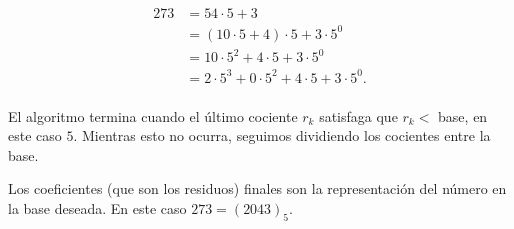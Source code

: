 \documentclass{article}
\begin{document}
\begin{align*}
	273 &= 54\cdot 5 + 3 \\
	&= (10\cdot 5 + 4)\cdot 5 + 3 \cdot 5^0 \\
	&= 10\cdot 5^2 + 4\cdot 5 + 3 \cdot 5^0 \\
	&= 2\cdot 5^3 + 0\cdot 5^2 + 4\cdot 5 + 3 \cdot 5^0. \\
\end{align*}

El algoritmo termina cuando el último cociente $r_k$ satisfaga que $r_k <$ base, en este caso $5$. Mientras esto no ocurra, seguimos dividiendo los cocientes entre la base.

\noindent Los coeficientes (que son los residuos) finales son la representación del número en la base deseada. En este caso $273=(2043)_5$.
\end{document}
